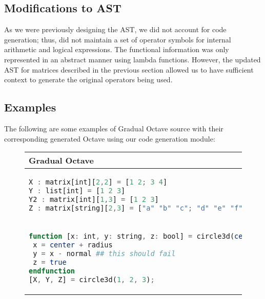 \subsection{Modifications to AST}
As we were previously designing the AST, we did not account for code generation; thus, did not maintain a set of operator symbols for internal arithmetic and logical expressions. The functional information was only represented in an abstract manner using lambda functions. However, the updated AST for matrices described in the previous section allowed us to have sufficient context to generate the original operators being used.

\subsection{Examples}
The following are some examples of Gradual Octave source with their corresponding generated Octave using our code generation module:

\lstset{
  basicstyle=\ttfamily,
  columns=fullflexible,
  breaklines=true,
}

\begin{figure}[h]
\begin{tabular}{|p{4cm}|p{4cm}|p{4cm}|}
\hline
Gradual Octave  &  Generated Octave \\
\hline
\begin{lstlisting}[language=octave,numbers=none]
X : matrix[int][2,2] = [1 2; 3 4]
Y : list[int] = [1 2 3]
Y2 : matrix[int][1,3] = [1 2 3]
Z : matrix[string][2,3] = ["a" "b" "c"; "d" "e" "f"]
\end{lstlisting}&
\begin{lstlisting}[language=octave,numbers=none]
X = [1 2; 3 4]
Y = [1 2 3]
Y2 = [1 2 3]
Z = ["a" "b" "c"; "d" "e" "f"]
\end{lstlisting} \\
\hline
\begin{lstlisting}[language=octave,numbers=none]
function [x: int, y: string, z: bool] = circle3d(center: int, normal: int, radius: int)
 x = center + radius
 y = x - normal ## this should fail
 z = true
endfunction
[X, Y, Z] = circle3d(1, 2, 3);
\end{lstlisting}&
\begin{lstlisting}[language=octave,numbers=none]
function [x, y, z] = circle3d(center, normal, radius)
    x = center+radius
    y = x-normal
    z = true
endfunction
[X, Y, Z] = circle3d(1, 2, 3)
\end{lstlisting} \\
\hline
\end{tabular}
\end{figure}

